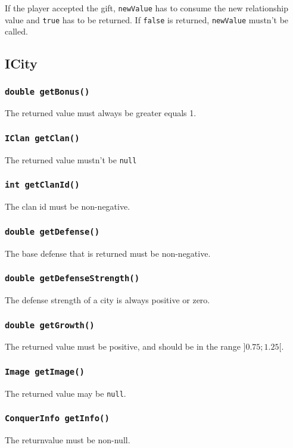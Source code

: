 \documentclass{article}
\begin{document}
If the player accepted the gift, \texttt{newValue} has to consume the new relationship value and
\texttt{true} has to be returned.
If \texttt{false} is returned, \texttt{newValue} mustn't be called.

\subsection{ICity}

\subsubsection{\texttt{double getBonus()}}
The returned value must always be greater equals 1.

\subsubsection{\texttt{IClan getClan()}}
The returned value mustn't be \texttt{null}

\subsubsection{\texttt{int getClanId()}}
The clan id must be non-negative.

\subsubsection{\texttt{double getDefense()}}
The base defense that is returned must be non-negative.

\subsubsection{\texttt{double getDefenseStrength()}}
The defense strength of a city is always positive or zero.

\subsubsection{\texttt{double getGrowth()}}
The returned value must be positive, and should be in the range $]0.75;1.25[$.

\subsubsection{\texttt{Image getImage()}}
The returned value may be \texttt{null}.

\subsubsection{\texttt{ConquerInfo getInfo()}}
The returnvalue must be non-null.
\end{document}
